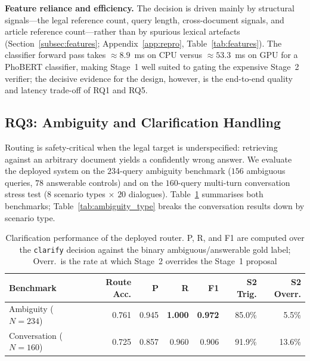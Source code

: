 \noindent\textbf{Feature reliance and efficiency.} The decision is driven
mainly by structural signals---the legal reference count, query length,
cross-document signals, and article reference count---rather than by spurious
lexical artefacts (Section~\ref{subsec:features};
Appendix~\ref{app:repro}, Table~\ref{tab:features}). The classifier forward
pass takes $\approx\!8.9$~ms on CPU versus $\approx\!53.3$~ms on GPU for a
PhoBERT classifier, making Stage~1 well suited to gating the expensive
Stage~2 verifier; the decisive evidence for the design, however, is the
end-to-end quality and latency trade-off of RQ1 and RQ5.

\subsection{RQ3: Ambiguity and Clarification Handling}\label{subsec:rq3}

Routing is safety-critical when the legal target is underspecified: retrieving
against an arbitrary document yields a confidently wrong answer. We evaluate
the deployed system on the $234$-query ambiguity benchmark ($156$ ambiguous
queries, $78$ answerable controls) and on the $160$-query multi-turn
conversation stress test ($8$ scenario types $\times$ $20$ dialogues).
Table~\ref{tab:ambiguity} summarises both benchmarks;
Table~\ref{tab:ambiguity_type} breaks the conversation results down by
scenario type.

\begin{table}[!htbp]
\centering
\caption{Clarification performance of the deployed router. P, R, and F1 are
computed over the \texttt{clarify} decision against the binary
ambiguous/answerable gold label; Overr.\ is the rate at which Stage~2
overrides the Stage~1 proposal}\label{tab:ambiguity}
\small
\begin{tabular}{lrrrrrr}
\toprule
\textbf{Benchmark} & \textbf{Route Acc.} & \textbf{P} & \textbf{R} & \textbf{F1} & \textbf{S2 Trig.} & \textbf{S2 Overr.} \\
\midrule
Ambiguity ($N{=}234$)    & 0.761 & 0.945 & \textbf{1.000} & \textbf{0.972} & 85.0\% & 5.5\% \\
Conversation ($N{=}160$) & 0.725 & 0.857 & 0.960 & 0.906 & 91.9\% & 13.6\% \\
\bottomrule
\end{tabular}
\end{table}

